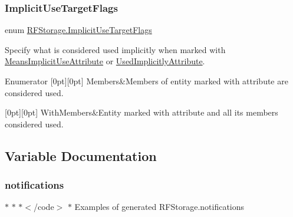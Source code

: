 \subsubsection{\texorpdfstring{ImplicitUseTargetFlags}{ImplicitUseTargetFlags}}
{\footnotesize\ttfamily enum \mbox{\hyperlink{namespace_r_f_storage_a11267cbdad6c26a08cf6b5c281d2f67b}{R\+F\+Storage.\+Implicit\+Use\+Target\+Flags}}\hspace{0.3cm}{\ttfamily [strong]}}



Specify what is considered used implicitly when marked with \mbox{\hyperlink{class_r_f_storage_1_1_means_implicit_use_attribute}{Means\+Implicit\+Use\+Attribute}} or \mbox{\hyperlink{class_r_f_storage_1_1_used_implicitly_attribute}{Used\+Implicitly\+Attribute}}. 

\begin{DoxyEnumFields}{Enumerator}
[0pt][0pt]{}\mbox{\label{namespace_r_f_storage_a11267cbdad6c26a08cf6b5c281d2f67baef53538ae41a651c7f72ab6cb1135d8c}} 
Members&Members of entity marked with attribute are considered used. \\
\hline

[0pt][0pt]{}\mbox{\label{namespace_r_f_storage_a11267cbdad6c26a08cf6b5c281d2f67ba5583bb135f4d32715af96327c369e623}} 
With\+Members&Entity marked with attribute and all its members considered used. \\
\hline

\end{DoxyEnumFields}


\subsection{Variable Documentation}
\mbox{\label{namespace_r_f_storage_a241376644238295cf61a8cc4cc3f7934}} 
\subsubsection{\texorpdfstring{notifications}{notifications}}
{\footnotesize\ttfamily $\ast$ $\ast$ $\ast$$<$/code$>$ $\ast$ Examples of generated R\+F\+Storage.\+notifications}



